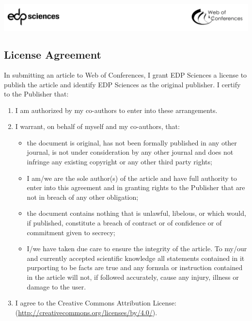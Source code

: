 \documentclass[a4paper,10pt]{article}
\begin{document}
\sffamily
\small
\raggedright

\begin{center}
    \includegraphics[width=\linewidth]{edp-logos.png}
\end{center}

\subsection*{License Agreement}

In submitting an article to Web of Conferences, I grant EDP Sciences a license to publish the article and identify EDP Sciences as the original publisher. I certify to the Publisher that:

\begin{enumerate}
    \item I am authorized by my co-authors to enter into these arrangements.
    \item I warrant, on behalf of myself and my co-authors, that:
    \begin{itemize}
        \item the document is original, has not been formally published in any other journal, is not under consideration by any other journal and does not infringe any existing copyright or any other third party rights;
        \item I am/we are the sole author(s) of the article and have full authority to enter into this agreement and in granting rights to the Publisher that are not in breach of any other obligation;
        \item the document contains nothing that is unlawful, libelous, or which would, if published, constitute a breach of contract or of confidence or of commitment given to secrecy;
        \item I/we have taken due care to ensure the integrity of the article. To my/our and currently accepted scientific knowledge all statements contained in it purporting to be facts are true and any formula or instruction contained in the article will not, if followed accurately, cause any injury, illness or damage to the user.
    \end{itemize}
    \item I agree to the Creative Commons Attribution License:\linebreak (\url{http://creativecommons.org/licenses/by/4.0/}).
\end{enumerate}
\end{document}
